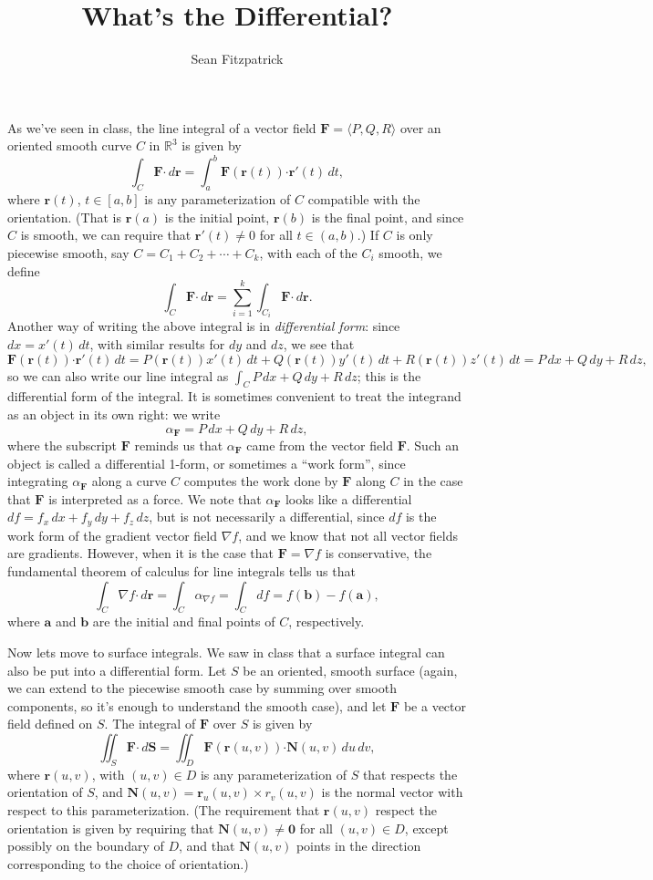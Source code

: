 \documentclass[letterpaper,12pt]{article}
\title{What's the Differential?}
\author{Sean Fitzpatrick}
\newcommand{\dotp}{\boldsymbol{\cdot}}
\renewcommand{\r}{\mathbf{r}}
\newcommand{\R}{\mathbb{R}}
\newcommand{\di}{\displaystyle}
\newcommand{\F}{\mathbf{F}}
\newcommand{\N}{\mathbf{N}}
\begin{document}
\maketitle

As we've seen in class, the line integral of a vector field $\F=\langle P,Q,R\rangle$ over an oriented smooth curve $C$ in $\R^3$ is given by
\[
\int_C \F\dotp\,d\r = \int_a^b\F(\r(t))\dotp \r'(t)\,dt,
\]
where $\r(t)$, $t\in [a,b]$ is any parameterization of $C$ compatible with the orientation. (That is $\r(a)$ is the initial point, $\r(b)$ is the final point, and since $C$ is smooth, we can require that $\r'(t)\neq 0$ for all $t\in(a,b)$.) If $C$ is only piecewise smooth, say $C=C_1+C_2+\cdots +C_k$, with each of the $C_i$ smooth, we define
\[
\int_C\F\dotp\,d\r = \sum_{i=1}^k\int_{C_i}\F\dotp\,d\r.
\]
Another way of writing the above integral is in {\em differential form}: since $dx = x'(t)\,dt$, with similar results for $dy$ and $dz$, we see that 
\[
\F(\r(t))\dotp\r'(t)\,dt = P(\r(t))x'(t)\,dt + Q(\r(t))y'(t)\,dt + R(\r(t))z'(t)\,dt = P\,dx+Q\,dy+R\,dz,
\]
so we can also write our line integral as $\di \int_C P\,dx+Q\,dy+R\,dz$; this is the differential form of the integral. It is sometimes convenient to treat the integrand as an object in its own right: we write
\[
\alpha_\F = P\,dx+Q\,dy+R\,dz,
\]
where the subscript $\F$ reminds us that $\alpha_\F$ came from the vector field $\F$. Such an object is called a differential 1-form, or sometimes a ``work form'', since integrating $\alpha_\F$ along a curve $C$ computes the work done by $\F$ along $C$ in the case that $\F$ is interpreted as a force. We note that $\alpha_\F$ looks like a differential $df = f_x\,dx+f_y\,dy+f_z\,dz$, but is not necessarily a differential, since $df$ is the work form of the gradient vector field $\nabla f$, and we know that not all vector fields are gradients. However, when it is the case that $\F=\nabla f$ is conservative, the fundamental theorem of calculus for line integrals tells us that
\[
\int_C \nabla f\dotp \,d\r = \int_C \alpha_{\nabla f} = \int_C df = f(\mathbf{b})-f(\mathbf{a}),
\]
where $\mathbf{a}$ and $\mathbf{b}$ are the initial and final points of $C$, respectively.

Now lets move to surface integrals. We saw in class that a surface integral can also be put into a differential form. Let $S$ be an oriented, smooth surface (again, we can extend to the piecewise smooth case by summing over smooth components, so it's enough to understand the smooth case), and let $\F$ be a vector field defined on $S$. The integral of $\F$ over $S$ is given by
\[
\iint_S \F\dotp\, d\mathbf{S} = \iint_D \F(\r(u,v))\dotp\N(u,v)\,du\,dv,
\]
where $\r(u,v)$, with $(u,v)\in D$ is any parameterization of $S$ that respects the orientation of $S$, and $\N(u,v) = \r_u(u,v)\times r_v(u,v)$ is the normal vector with respect to this parameterization. (The requirement that $\r(u,v)$ respect the orientation is given by requiring that $\N(u,v)\neq\mathbf{0}$ for all $(u,v)\in D$, except possibly on the boundary of $D$, and that $\N(u,v)$ points in the direction corresponding to the choice of orientation.)
\end{document}
